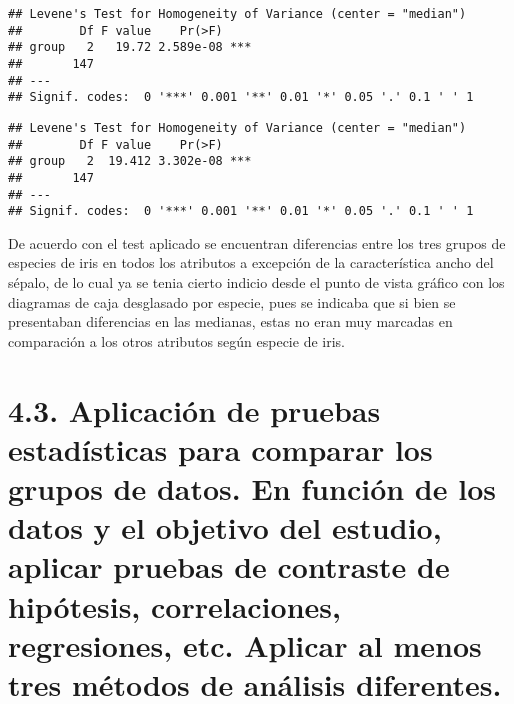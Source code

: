 \documentclass[
]{article}
\newenvironment{Shaded}{\begin{snugshade}}{\end{snugshade}}
\newcommand{\AttributeTok}[1]{\textcolor[rgb]{0.77,0.63,0.00}{#1}}
\newcommand{\FunctionTok}[1]{\textcolor[rgb]{0.00,0.00,0.00}{#1}}
\newcommand{\NormalTok}[1]{#1}
\newcommand{\SpecialCharTok}[1]{\textcolor[rgb]{0.00,0.00,0.00}{#1}}
\newcommand{\StringTok}[1]{\textcolor[rgb]{0.31,0.60,0.02}{#1}}
\begin{document}
\begin{verbatim}
## Levene's Test for Homogeneity of Variance (center = "median")
##        Df F value    Pr(>F)    
## group   2   19.72 2.589e-08 ***
##       147                      
## ---
## Signif. codes:  0 '***' 0.001 '**' 0.01 '*' 0.05 '.' 0.1 ' ' 1
\end{verbatim}

\begin{Shaded}
\end{Shaded}

\begin{verbatim}
## Levene's Test for Homogeneity of Variance (center = "median")
##        Df F value    Pr(>F)    
## group   2  19.412 3.302e-08 ***
##       147                      
## ---
## Signif. codes:  0 '***' 0.001 '**' 0.01 '*' 0.05 '.' 0.1 ' ' 1
\end{verbatim}

De acuerdo con el test aplicado se encuentran diferencias entre los tres
grupos de especies de iris en todos los atributos a excepción de la
característica ancho del sépalo, de lo cual ya se tenia cierto indicio
desde el punto de vista gráfico con los diagramas de caja desglasado por
especie, pues se indicaba que si bien se presentaban diferencias en las
medianas, estas no eran muy marcadas en comparación a los otros
atributos según especie de iris.

\hypertarget{aplicaciuxf3n-de-pruebas-estaduxedsticas-para-comparar-los-grupos-de-datos.-en-funciuxf3n-de-los-datos-y-el-objetivo-del-estudio-aplicar-pruebas-de-contraste-de-hipuxf3tesis-correlaciones-regresiones-etc.-aplicar-al-menos-tres-muxe9todos-de-anuxe1lisis-diferentes.}{%
\section{4.3. Aplicación de pruebas estadísticas para comparar los
grupos de datos. En función de los datos y el objetivo del estudio,
aplicar pruebas de contraste de hipótesis, correlaciones, regresiones,
etc. Aplicar al menos tres métodos de análisis
diferentes.}\label{aplicaciuxf3n-de-pruebas-estaduxedsticas-para-comparar-los-grupos-de-datos.-en-funciuxf3n-de-los-datos-y-el-objetivo-del-estudio-aplicar-pruebas-de-contraste-de-hipuxf3tesis-correlaciones-regresiones-etc.-aplicar-al-menos-tres-muxe9todos-de-anuxe1lisis-diferentes.}}
\end{document}
